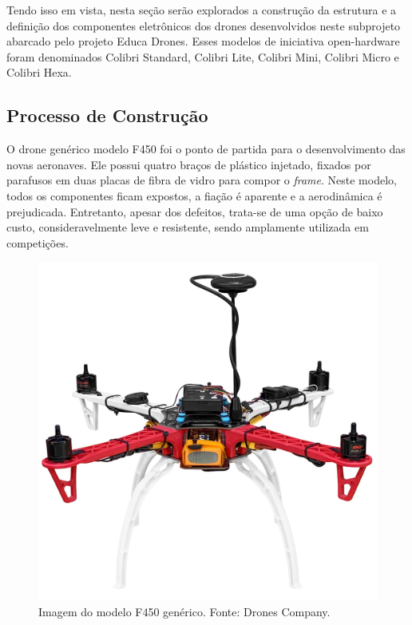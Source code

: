 \documentclass[conference]{IEEEtran}
\begin{document}
Tendo isso em vista, nesta seção serão explorados a construção da estrutura e a definição dos componentes eletrônicos dos drones desenvolvidos neste subprojeto abarcado pelo projeto Educa Drones. Esses modelos de iniciativa open-hardware foram denominados Colibri Standard, Colibri Lite, Colibri Mini, Colibri Micro e Colibri Hexa.


\subsection{Processo de Construção}

O drone genérico modelo F450 foi o ponto de partida para o desenvolvimento das novas aeronaves. Ele possui quatro braços de plástico injetado, fixados por parafusos em duas placas de fibra de vidro para compor o \textit{frame}. Neste modelo, todos os componentes ficam expostos, a fiação é aparente e a aerodinâmica é prejudicada. Entretanto, apesar dos defeitos, trata-se de uma opção de baixo custo, consideravelmente leve e resistente, sendo amplamente utilizada em competições. 

\begin{figure}[!htb]
    \centering
    \includegraphics[scale=0.07]{img/f450.jpg} 
    \caption{Imagem do modelo F450 genérico. Fonte: Drones Company.}
    \label{fig:F450}
\end{figure}
\end{document}
